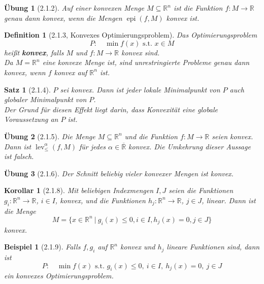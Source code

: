 \documentclass[12pt]{extreport} %
\newcommand{\R}{\mathbb{R}}
\theoremstyle{named}
\theoremstyle{nnamed}
\theoremstyle{itshape}
\newtheorem*{satz}{Satz}
\newtheorem*{definition}{Definition}
\theoremstyle{normal}
\newtheorem*{beispiel}{Beispiel}
\newtheorem*{korollar}{Korollar}
\newtheorem*{uebung}{Übung}
\begin{document}
\begin{uebung}[2.1.2] %
	Auf einer konvexen Menge $M \subseteq \R^n$ ist die Funktion $f \colon M \rightarrow \R$ genau dann konvex, wenn die Mengen $\operatorname{epi}(f, M)$ konvex ist.	
\end{uebung}

\begin{definition}[2.1.3, Konvexes Optimierungsproblem]
	Das Optimierungsproblem
	$$ P: \quad \min f(x) \text{ s.t. } x \in M $$
	heißt \textbf{konvex}, falls $M$ und $f \colon M \rightarrow \R$ konvex sind. ~\\
	
	Da $M = \R^n$ eine konvexe Menge ist, sind unrestringierte Probleme genau dann konvex, wenn $f$ konvex auf $\R^n$ ist.
\end{definition}

\begin{satz}[2.1.4]
	$P$ sei konvex. Dann ist jeder lokale Minimalpunkt von $P$ auch globaler Minimalpunkt von $P$. ~\\
	
	Der Grund für diesen Effekt liegt darin, dass Konvexität eine globale Voraussetzung an $P$ ist.	
\end{satz}

\begin{uebung}[2.1.5] %
	Die Menge $M \subseteq \R^n$ und die Funktion $f \colon M \rightarrow \R$ seien konvex. Dann ist $\operatorname{lev}_{\leq}^{\alpha}(f, M)$ für jedes $\alpha \in \overline{\R}$ konvex. Die Umkehrung dieser Aussage ist falsch.	
\end{uebung}

\begin{uebung}[2.1.6]
	Der Schnitt beliebig vieler konvexer Mengen ist konvex.	
\end{uebung}

\begin{korollar}[2.1.8]
	Mit beliebigen Indexmengen $I, J$ seien die Funktionen $g_i \colon \R^n \rightarrow \R$, $i \in I$, konvex, und die Funktionen $h_j \colon \R^n \rightarrow \R$, $j \in J$, linear. Dann ist die Menge
	$$ M = \big\{ x \in \R^n ~|~g_i(x) \leq 0, i \in I, h_j(x) = 0, j \in J \big\} $$
	konvex.
\end{korollar}

\begin{beispiel}[2.1.9]
	Falls $f, g_i$ auf $\R^n$ konvex und $h_j$ lineare Funktionen sind, dann ist
	$$ P: \quad \min f(x) \text{ s.t. } g_i(x) \leq 0, ~ i \in I,~h_j(x) = 0, ~j \in J $$	
	ein konvexes Optimierungsproblem.
\end{beispiel}
\end{document}
